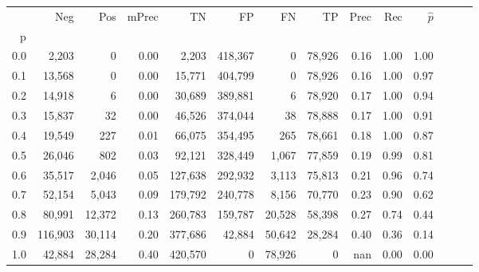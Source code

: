 \begin{tabular}{rrrrrrrrrrrrrr}
\toprule
{} &      Neg &     Pos & mPrec &       TN &       FP &      FN &      TP &  Prec &   Rec & $\hat{p}$ \\
p   &          &         &       &          &          &         &         &       &       &           \\
\midrule
0.0 &    2,203 &       0 &  0.00 &    2,203 &  418,367 &       0 &  78,926 &  0.16 &  1.00 &      1.00 \\
0.1 &   13,568 &       0 &  0.00 &   15,771 &  404,799 &       0 &  78,926 &  0.16 &  1.00 &      0.97 \\
0.2 &   14,918 &       6 &  0.00 &   30,689 &  389,881 &       6 &  78,920 &  0.17 &  1.00 &      0.94 \\
0.3 &   15,837 &      32 &  0.00 &   46,526 &  374,044 &      38 &  78,888 &  0.17 &  1.00 &      0.91 \\
0.4 &   19,549 &     227 &  0.01 &   66,075 &  354,495 &     265 &  78,661 &  0.18 &  1.00 &      0.87 \\
0.5 &   26,046 &     802 &  0.03 &   92,121 &  328,449 &   1,067 &  77,859 &  0.19 &  0.99 &      0.81 \\
0.6 &   35,517 &   2,046 &  0.05 &  127,638 &  292,932 &   3,113 &  75,813 &  0.21 &  0.96 &      0.74 \\
0.7 &   52,154 &   5,043 &  0.09 &  179,792 &  240,778 &   8,156 &  70,770 &  0.23 &  0.90 &      0.62 \\
0.8 &   80,991 &  12,372 &  0.13 &  260,783 &  159,787 &  20,528 &  58,398 &  0.27 &  0.74 &      0.44 \\
0.9 &  116,903 &  30,114 &  0.20 &  377,686 &   42,884 &  50,642 &  28,284 &  0.40 &  0.36 &      0.14 \\
1.0 &   42,884 &  28,284 &  0.40 &  420,570 &        0 &  78,926 &       0 &   nan &  0.00 &      0.00 \\
\bottomrule
\end{tabular}
